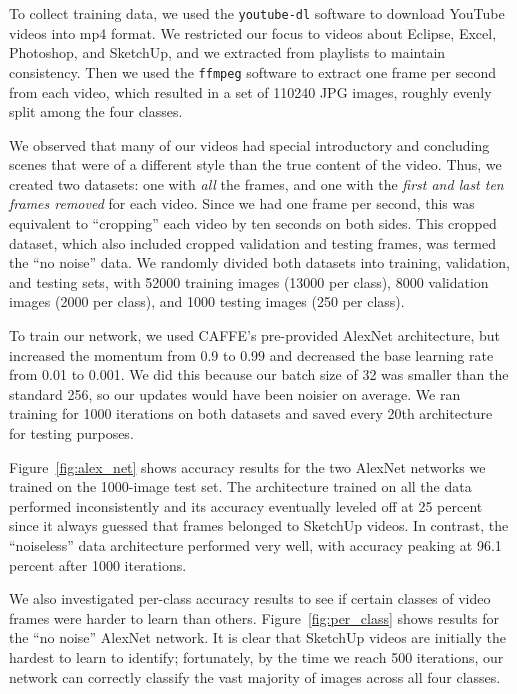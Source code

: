 \documentclass[10pt]{article}
\begin{document}
To collect training data, we used the \texttt{youtube-dl} software to download YouTube videos into
mp4 format. We restricted our focus to videos about Eclipse, Excel, Photoshop, and SketchUp, and we
extracted from playlists to maintain consistency. Then we used the \texttt{ffmpeg} software to
extract one frame per second from each video, which resulted in a set of 110240 JPG images, roughly
evenly split among the four classes. 

We observed that many of our videos had special introductory and concluding scenes that were of a
different style than the true content of the video. Thus, we created two datasets: one with
\emph{all} the frames, and one with the \emph{first and last ten frames removed} for each video.
Since we had one frame per second, this was equivalent to ``cropping'' each video by ten seconds on
both sides. This cropped dataset, which also included cropped validation and testing frames, was
termed the ``no noise'' data. We randomly divided both datasets into training, validation, and
testing sets, with 52000 training images (13000 per class), 8000 validation images (2000 per class),
and 1000 testing images (250 per class).

To train our network, we used CAFFE's pre-provided AlexNet architecture, but increased the momentum
from 0.9 to 0.99 and decreased the base learning rate from 0.01 to 0.001. We did this because our
batch size of 32 was smaller than the standard 256, so our updates would have been noisier on
average. We ran training for 1000 iterations on both datasets and saved every 20th architecture for
testing purposes.

Figure~\ref{fig:alex_net} shows accuracy results for the two AlexNet networks we trained on the
1000-image test set. The architecture trained on all the data performed inconsistently and its
accuracy eventually leveled off at 25 percent since it always guessed that frames belonged to
SketchUp videos. In contrast, the ``noiseless'' data architecture performed very well, with accuracy
peaking at 96.1 percent after 1000 iterations.

We also investigated per-class accuracy results to see if certain classes of video frames were
harder to learn than others. Figure~\ref{fig:per_class} shows results for the ``no noise'' AlexNet
network. It is clear that SketchUp videos are initially the hardest to learn to identify;
fortunately, by the time we reach 500 iterations, our network can correctly classify the vast
majority of images across all four classes.
\end{document}
